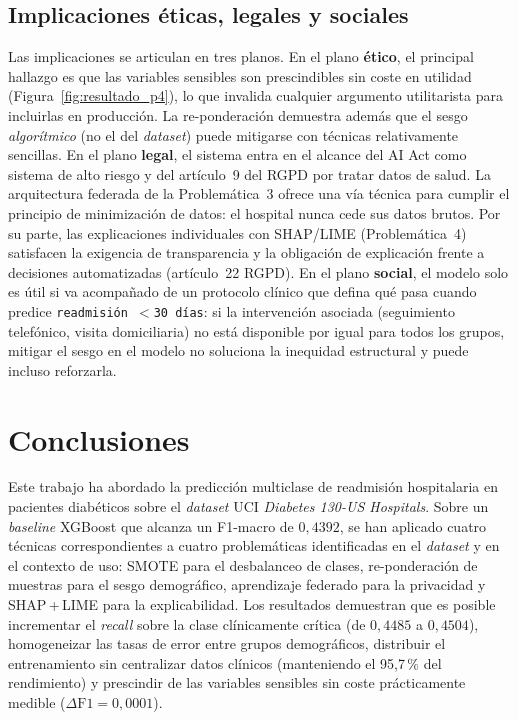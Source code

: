 \documentclass[11pt,a4paper]{article}
\begin{document}
\subsection{Implicaciones éticas, legales y sociales}

Las implicaciones se articulan en tres planos. En el plano \textbf{ético}, el principal hallazgo es que las variables sensibles son prescindibles sin coste en utilidad (Figura~\ref{fig:resultado_p4}), lo que invalida cualquier argumento utilitarista para incluirlas en producción. La re-ponderación demuestra además que el sesgo \emph{algorítmico} (no el del \textit{dataset}) puede mitigarse con técnicas relativamente sencillas. En el plano \textbf{legal}, el sistema entra en el alcance del AI Act como sistema de alto riesgo y del artículo~9 del RGPD por tratar datos de salud. La arquitectura federada de la Problemática~3 ofrece una vía técnica para cumplir el principio de minimización de datos: el hospital nunca cede sus datos brutos. Por su parte, las explicaciones individuales con SHAP/LIME (Problemática~4) satisfacen la exigencia de transparencia y la obligación de explicación frente a decisiones automatizadas (artículo~22 RGPD). En el plano \textbf{social}, el modelo solo es útil si va acompañado de un protocolo clínico que defina qué pasa cuando predice \texttt{readmisión $<$30 días}: si la intervención asociada (seguimiento telefónico, visita domiciliaria) no está disponible por igual para todos los grupos, mitigar el sesgo en el modelo no soluciona la inequidad estructural y puede incluso reforzarla.


\section{Conclusiones}
\label{sec:conclusiones}

Este trabajo ha abordado la predicción multiclase de readmisión hospitalaria en pacientes diabéticos sobre el \textit{dataset} UCI \textit{Diabetes 130-US Hospitals}. Sobre un \textit{baseline} XGBoost que alcanza un F1-macro de $0{,}4392$, se han aplicado cuatro técnicas correspondientes a cuatro problemáticas identificadas en el \textit{dataset} y en el contexto de uso: SMOTE para el desbalanceo de clases, re-ponderación de muestras para el sesgo demográfico, aprendizaje federado para la privacidad y SHAP\,+\,LIME para la explicabilidad. Los resultados demuestran que es posible incrementar el \textit{recall} sobre la clase clínicamente crítica (de $0{,}4485$ a $0{,}4504$), homogeneizar las tasas de error entre grupos demográficos, distribuir el entrenamiento sin centralizar datos clínicos (manteniendo el 95{,}7\,\% del rendimiento) y prescindir de las variables sensibles sin coste prácticamente medible ($\Delta\text{F1}=0{,}0001$).
\end{document}
